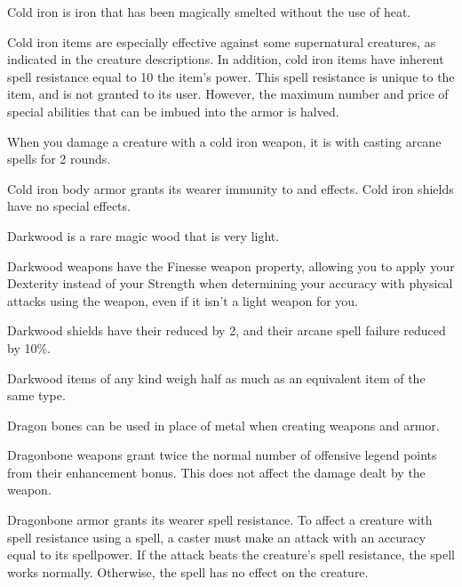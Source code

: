 
        Cold iron is iron that has been magically smelted without the use of heat.

        Cold iron items are especially effective against some supernatural creatures, as indicated in the creature descriptions.
        In addition, cold iron items have inherent spell resistance equal to 10 \add the item's power.
        This spell resistance is unique to the item, and is not granted to its user.
        However, the maximum number and price of special abilities that can be imbued into the armor is halved.

        When you damage a creature with a cold iron weapon, it is \impaired with casting arcane spells for 2 rounds.

        Cold iron body armor grants its wearer immunity to  and  effects.
        Cold iron shields have no special effects.

        Darkwood is a rare magic wood that is very light.

        Darkwood weapons have the Finesse weapon property, allowing you to apply your Dexterity instead of your Strength when determining your accuracy with physical attacks using the weapon, even if it isn't a light weapon for you.

        Darkwood shields have their  reduced by 2, and their arcane spell failure reduced by 10\%.

        Darkwood items of any kind weigh half as much as an equivalent item of the same type.


        Dragon bones can be used in place of metal when creating weapons and armor.

        Dragonbone weapons grant twice the normal number of offensive legend points from their enhancement bonus.
        This does not affect the damage dealt by the weapon.

        Dragonbone armor grants its wearer spell resistance.
        To affect a creature with spell resistance using a spell, a caster must make an attack with an accuracy equal to its spellpower.
        If the attack beats the creature's spell resistance, the spell works normally.
        Otherwise, the spell has no effect on the creature.


